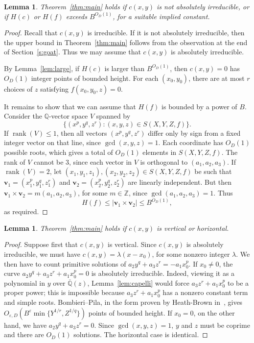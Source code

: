 \documentclass[a4paper,11pt,twoside,reqno]{amsart}
\newtheorem{lemma}[theorem]{Lemma}
\theoremstyle{definition}
\theoremstyle{remark}
\numberwithin{equation}{section}
\newcommand\eps{\varepsilon}
\newcommand\ve{\varepsilon}
\newcommand\ZZ{\mathbb{Z}}
\newcommand\Q{\mathbb{Q}}
\newcommand\K{\overline{\mathbb{Q}}}
\newcommand\1{\mathbf{1}}
\DeclareMathOperator\rank{rank}
\renewcommand{\leq}{\leqslant}
\begin{document}
\begin{lemma}\label{lem:height-reduction}
Theorem~\ref{thm:main} holds if $c(x,y)$ is not absolutely irreducible, or if $H(c)$ or $H(f)$ exceeds $B^{O_D(1)}$, for a suitable implied constant.
\end{lemma}

\begin{proof}
Recall that $c(x,y)$ is irreducible. If it is not absolutely irreducible, then the upper bound in Theorem~\ref{thm:main} follows from the observation at the end of Section~\ref{s:goat}. Thus we may assume that $c(x,y)$ is absolutely irreducible.

By Lemma~\ref{lem:large}, if $H(c)$ is larger than $B^{O_D(1)}$, then $c(x,y)=0$ has $O_D(1)$ integer points of bounded height. For each $(x_0,y_0)$, there are at most $r$ choices of $z$ satisfying $f(x_0,y_0,z)=0$.

It remains to show that we can assume that $H(f)$ is bounded by a power of $B$. 
Consider the $\Q$-vector space $V$ spanned by \[
\{(x^p,y^q,z^r):(x,y,z)\in S(X,Y,Z,f)\}.
\] 
If $\rank(V)\leq 1$, then 
all vectors $(x^p,y^q,z^r)$ differ only by sign from a fixed integer vector on that line, 
since $\gcd(x,y,z)=1$. Each coordinate has $O_D(1)$ possible roots, which gives a total of $O_D(1)$ elements in $S(X,Y,Z,f)$. The rank of $V$ cannot be $3$, since each vector in $V$ is orthogonal to $(a_1,a_2,a_3)$. If $\rank(V)=2$, let $(x_1,y_1,z_1),(x_2,y_2,z_2)\in S(X,Y,Z,f)$ be such that $\mathbf{v}_1=(x_1^p,y_1^q,z_1^r)$ and $\mathbf{v}_2=(x_2^p,y_2^q,z_2^r)$ are linearly independent. But then $\mathbf{v}_1\times \mathbf{v}_2=m(a_1,a_2,a_3)$, for some $m\in \ZZ$, since $\gcd(a_1,a_2,a_3)=1$. Thus 
\[
H(f)\leq |\mathbf{v}_1\times \mathbf{v}_2|\leq B^{O_D(1)},
\] 
as required. 
\end{proof}

\begin{lemma}\label{lem:vertical-horizontal}
Theorem~\ref{thm:main} holds if $c(x,y)$ is vertical or horizontal.
\end{lemma}

\begin{proof}
Suppose first that $c(x,y)$ is vertical. Since $c(x,y)$ is absolutely irreducible, we must have $c(x,y)=\lambda(x-x_0)$, for some nonzero integer $\lambda$. We then have to count primitive solutions of $a_2y^q+a_3z^r=-a_1x_0^p$. If $x_0\neq 0$, the curve $a_2y^q+a_3z^r+a_1x_0^p=0$ is absolutely irreducible. Indeed, viewing it as a polynomial in $y$ over $\K(z)$, 
Lemma~\ref{lem:capelli} would force $a_3z^r+a_1x_0^p$ to be a proper power; this is impossible because $a_3z^r+a_1x_0^p$ has a nonzero constant term and simple roots. Bombieri--Pila, in the form proven by Heath-Brown in~\cite[Theorem 15]{HeathBrown}, gives $O_{\eps,D}(B^{\ve}\min\{Y^{1/r},Z^{1/q}\})$ points of bounded height. If $x_0=0$, on the other hand, we have $a_2y^q+a_3z^r=0$. Since $\gcd(x,y,z)=1$, $y$ and $z$ must be coprime and there are $O_D(1)$ solutions. The horizontal case is identical.
\end{proof}
\end{document}
